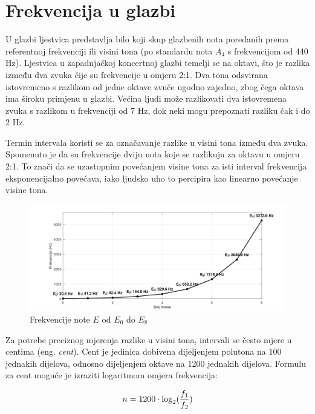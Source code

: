 \documentclass[times, utf8, diplomski, numeric]{fer}
\begin{document}
\section{Frekvencija u glazbi}
U glazbi ljestvica predstavlja bilo koji skup glazbenih nota poredanih prema referentnoj frekvenciji ili visini tona (po standardu nota $A_4$ s frekvencijom od 440 Hz). Ljestvica u zapadnjačkoj koncertnoj glazbi temelji se na oktavi, što je razlika između dva zvuka čije su frekvencije u omjeru 2:1. Dva tona odsvirana istovremeno s razlikom od jedne oktave zvuče ugodno zajedno, zbog čega oktava ima široku primjenu u glazbi. Većina ljudi može razlikovati dva istovremena zvuka s razlikom u frekvenciji od 7 Hz, dok neki mogu prepoznati razliku čak i do 2 Hz.

Termin intervala koristi se za označavanje razlike u visini tona između dva zvuka.\cite{prout2011harmony} Spomenuto je da su frekvencije dviju nota koje se razlikuju za oktavu u omjeru 2:1. To znači da se uzastopnim povećanjem visine tona za isti interval frekvencija eksponencijalno povećava, iako ljudsko uho to percipira kao linearno povećanje visine tona.

\begin{figure}[H]
	\centerline{\includegraphics[width=1.1\textwidth]{octave_increase.png}}
	\caption{Frekvencije note $E$ od $E_0$ do $E_8$}
	\label{fig}
\end{figure}

Za potrebe preciznog mjerenja razlike u visini tona, intervali se često mjere u centima (eng. \textit{cent}).\cite{benson2006music} Cent je jedinica dobivena dijeljenjem polutona na 100 jednakih dijelova, odnosno dijeljenjem oktave na 1200 jednakih dijelova. Formulu za cent moguće je izraziti logaritmom omjera frekvencija:

\begin{equation}
	n = 1200 \cdot \log_2(\dfrac{f_1}{f_2}) \\ 
\end{equation}
\end{document}
